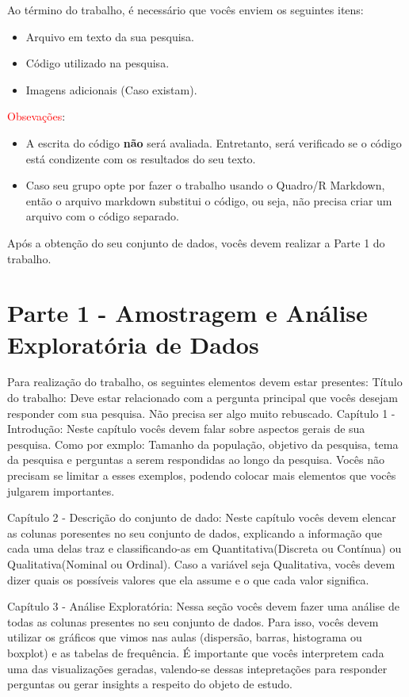 \documentclass{article}
\begin{document}
Ao término do trabalho, é necessário que vocês enviem os seguintes itens:

\begin{itemize}
    \item Arquivo em texto da sua pesquisa. 
    \item Código utilizado na pesquisa.  
    \item Imagens adicionais (Caso existam).
\end{itemize}

\textcolor{red}{Obsevações}:
\begin{itemize}
    \item A escrita do código \textbf{não} será avaliada. Entretanto, será verificado se o código está condizente com os resultados do seu texto. 
    \item Caso seu grupo opte por fazer o trabalho usando o Quadro/R Markdown, então o arquivo markdown substitui o código, ou seja, 
    não precisa criar um arquivo com o código separado. 
\end{itemize}

Após a obtenção do seu conjunto de dados, vocês devem realizar a Parte 1 do trabalho. 

\section{Parte 1 - Amostragem e Análise Exploratória de Dados}

Para realização do trabalho, os seguintes elementos devem estar presentes:
Título do trabalho: Deve estar relacionado com a pergunta principal que vocês desejam responder com sua pesquisa. Não precisa ser algo muito rebuscado.  
Capítulo 1 - Introdução: Neste capítulo vocês devem falar sobre aspectos gerais de sua pesquisa. Como por exmplo: Tamanho da população, objetivo da pesquisa, tema da pesquisa e
perguntas a serem respondidas ao longo da pesquisa. Vocês não precisam se limitar a esses exemplos, podendo colocar mais elementos que vocês julgarem importantes. 

Capítulo 2 - Descrição do conjunto de dado: Neste capítulo vocês devem elencar as colunas poresentes no seu conjunto de dados, explicando a informação que cada uma delas traz 
e classificando-as em Quantitativa(Discreta ou Contínua) ou Qualitativa(Nominal ou Ordinal). Caso a variável seja Qualitativa, vocês devem dizer quais os possíveis valores que ela assume e 
o que cada valor significa. 

Capítulo 3 - Análise Exploratória: Nessa seção vocês devem fazer uma análise de todas as colunas presentes no seu conjunto de dados. Para isso, vocês devem utilizar
os gráficos que vimos nas aulas (dispersão, barras, histograma ou boxplot) e as tabelas de frequência. É importante que vocês interpretem cada uma das visualizações geradas, 
valendo-se dessas intepretações para responder perguntas ou gerar insights a respeito do objeto de estudo. 
\end{document}
